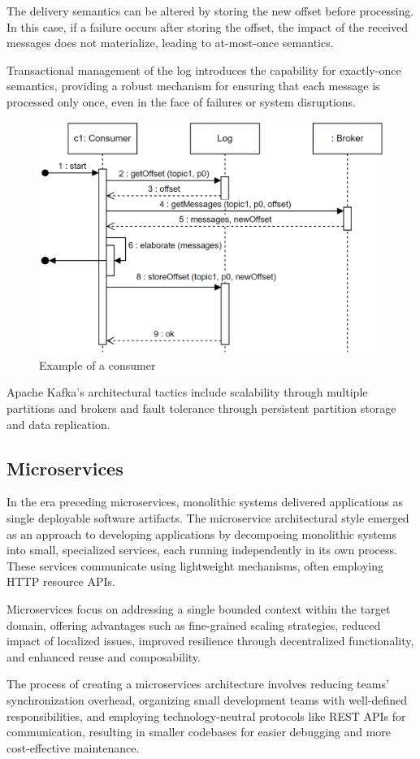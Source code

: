 The delivery semantics can be altered by storing the new offset before processing. 
In this case, if a failure occurs after storing the offset, the impact of the received messages does not materialize, leading to at-most-once semantics.

Transactional management of the log introduces the capability for exactly-once semantics, providing a robust mechanism for ensuring that each message is processed only once, even in the face of failures or system disruptions.
\begin{figure}[H]
    \centering
    \includegraphics[width=0.75\linewidth]{images/consumer.png}
    \caption{Example of a consumer}
\end{figure}
Apache Kafka's architectural tactics include scalability through multiple partitions and brokers and fault tolerance through persistent partition storage and data replication.

\subsection{Microservices}
In the era preceding microservices, monolithic systems delivered applications as single deployable software artifacts. 
The microservice architectural style emerged as an approach to developing applications by decomposing monolithic systems into small, specialized services, each running independently in its own process. 
These services communicate using lightweight mechanisms, often employing HTTP resource APIs.

Microservices focus on addressing a single bounded context within the target domain, offering advantages such as fine-grained scaling strategies, reduced impact of localized issues, improved resilience through decentralized functionality, and enhanced reuse and composability.

The process of creating a microservices architecture involves reducing teams' synchronization overhead, organizing small development teams with well-defined responsibilities, and employing technology-neutral protocols like REST APIs for communication, resulting in smaller codebases for easier debugging and more cost-effective maintenance.


